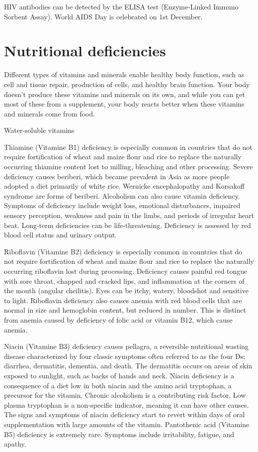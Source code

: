 \documentclass[
  openany]{book}
\begin{document}
HIV antibodies can be detected by the ELISA test (Enzyme-Linked Immuno Sorbent Assay). World AIDS Day is celebrated on 1st December.

\hypertarget{nutritional-deficiencies}{%
\section{Nutritional deficiencies}\label{nutritional-deficiencies}}

Different types of vitamins and minerals enable healthy body function, such as cell and tissue repair, production of cells, and healthy brain function. Your body doesn't produce these vitamins and minerals on its own, and while you can get most of these from a supplement, your body reacts better when these vitamins and minerals come from food.

Water-soluble vitamins

Thiamine (Vitamine B1) deficiency is especially common in countries that do not require fortification of wheat and maize flour and rice to replace the naturally occurring thiamine content lost to milling, bleaching and other processing. Severe deficiency causes beriberi, which became prevalent in Asia as more people adopted a diet primarily of white rice. Wernicke encephalopathy and Korsakoff syndrome are forms of beriberi. Alcoholism can also cause vitamin deficiency. Symptoms of deficiency include weight loss, emotional disturbances, impaired sensory perception, weakness and pain in the limbs, and periods of irregular heart beat. Long-term deficiencies can be life-threatening. Deficiency is assessed by red blood cell status and urinary output.

Riboflavin (Vitamine B2) deficiency is especially common in countries that do not require fortification of wheat and maize flour and rice to replace the naturally occurring riboflavin lost during processing. Deficiency causes painful red tongue with sore throat, chapped and cracked lips, and inflammation at the corners of the mouth (angular cheilitis). Eyes can be itchy, watery, bloodshot and sensitive to light. Riboflavin deficiency also causes anemia with red blood cells that are normal in size and hemoglobin content, but reduced in number. This is distinct from anemia caused by deficiency of folic acid or vitamin B12, which cause anemia.

Niacin (Vitamine B3) deficiency causes pellagra, a reversible nutritional wasting disease characterized by four classic symptoms often referred to as the four Ds: diarrhea, dermatitis, dementia, and death. The dermatitis occurs on areas of skin exposed to sunlight, such as backs of hands and neck. Niacin deficiency is a consequence of a diet low in both niacin and the amino acid tryptophan, a precursor for the vitamin. Chronic alcoholism is a contributing risk factor. Low plasma tryptophan is a non-specific indicator, meaning it can have other causes. The signs and symptoms of niacin deficiency start to revert within days of oral supplementation with large amounts of the vitamin.
Pantothenic acid (Vitamine B5) deficiency is extremely rare. Symptoms include irritability, fatigue, and apathy.
\end{document}
